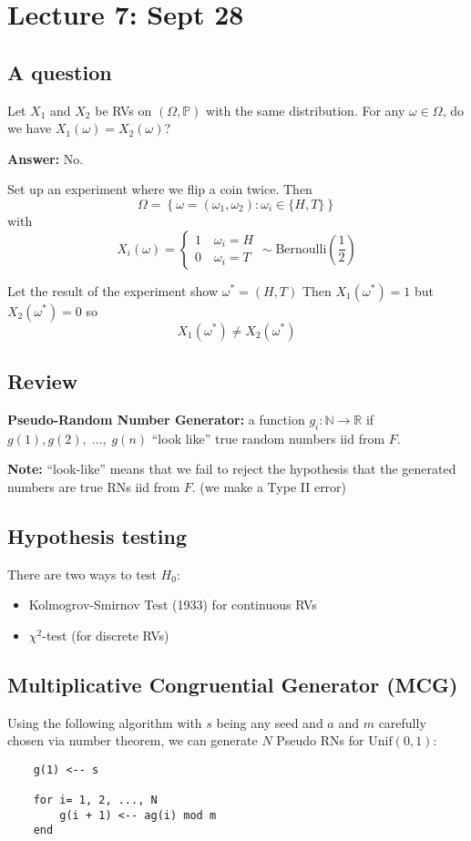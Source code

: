 \documentclass[12pt]{article}
\renewcommand{\P}{\mathbb{P}}
\newcommand{\R}{\mathbb{R}}
\newcommand{\ellipsis}{\; \dots, \;}
\begin{document}
\section{Lecture 7: Sept 28}
\subsection{A question}
Let $X_1$ and $X_2$ be RVs on $(\Omega, \P)$ with the same distribution. For any $\omega \in \Omega$, do we have $X_1(\omega) = X_2(\omega)$? 

\textbf{Answer:} No.

Set up an experiment where we flip a coin twice. Then 
\[\Omega = \left\{\omega = (\omega_1, \omega_2): \omega_i \in \{H, T\}\right\}\]
with 
\[X_i(\omega) = \begin{cases}
    1 \quad \omega_i = H\\
    0 \quad \omega_i = T
\end{cases} \sim \text{Bernoulli}\left(\frac{1}{2}\right)\]

Let the result of the experiment show $\omega^* = (H, T)$ Then $X_1(\omega^*) = 1$ but $X_2(\omega^*) = 0$ so 
\[X_1(\omega^*) \neq X_2(\omega^*)\]

\subsection{Review}
\textbf{Pseudo-Random Number Generator:} a function $g_i: \mathbb{N} \to \R$ if $g(1), g(2), \ellipsis g(n)$ ``look like'' true random numbers iid from $F$. 

\textbf{Note:} ``look-like'' means that we fail to reject the hypothesis that the generated numbers are true RNs iid from $F$. (we make a Type II error)

\subsection{Hypothesis testing}
There are two ways to test $H_0$:
\begin{itemize}
    \item Kolmogrov-Smirnov Test (1933) for continuous RVs
    \item $\chi^2$-test (for discrete RVs)
\end{itemize}

\subsection{Multiplicative Congruential Generator (MCG)}
Using the following algorithm with $s$ being any seed and $a$ and $m$ carefully chosen via number theorem, we can generate $N$ Pseudo RNs for $\text{Unif}(0, 1)$:
\begin{verbatim}
    g(1) <-- s

    for i= 1, 2, ..., N
        g(i + 1) <-- ag(i) mod m
    end
\end{verbatim}
\end{document}
